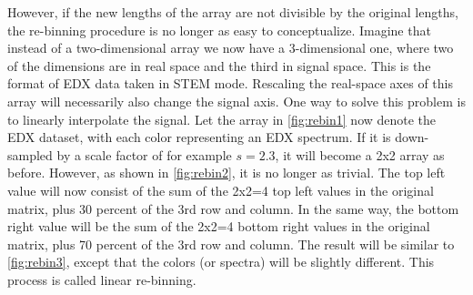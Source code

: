 However, if the new lengths of the array are not divisible by the original lengths, the re-binning procedure is no longer as easy to conceptualize. Imagine that instead of a two-dimensional array we now have a 3-dimensional one, where two of the dimensions are in real space and the third in signal space. This is the format of EDX data taken in STEM mode. Rescaling the real-space axes of this array will necessarily also change the signal axis. One way to solve this problem is to linearly interpolate the signal. Let the array in \cref{fig:rebin1} now denote the EDX dataset, with each color representing an EDX spectrum. If it is down-sampled by a scale factor of for example $s=2.3$, it will become a 2x2 array as before. However, as shown in \cref{fig:rebin2}, it is no longer as trivial. The top left value will now consist of the sum of the 2x2=4 top left values in the original matrix, plus 30 percent of the 3rd row and column. In the same way, the bottom right value will be the sum of the 2x2=4 bottom right values in the original matrix, plus 70 percent of the 3rd row and column. The result will be similar to \cref{fig:rebin3}, except that the colors (or spectra) will be slightly different. This process is called linear re-binning.
